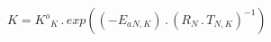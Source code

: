 \documentclass[border=1pt]{standalone}
\begin{document}
$K={{K^o}}{_{K}} \, . \, exp(\left( -{E_a}{_{N, K}} \right) \, . \, \left( {R}{_{N}} \, . \, {T}{_{N, K}} \right)^{-1})$
\end{document}

